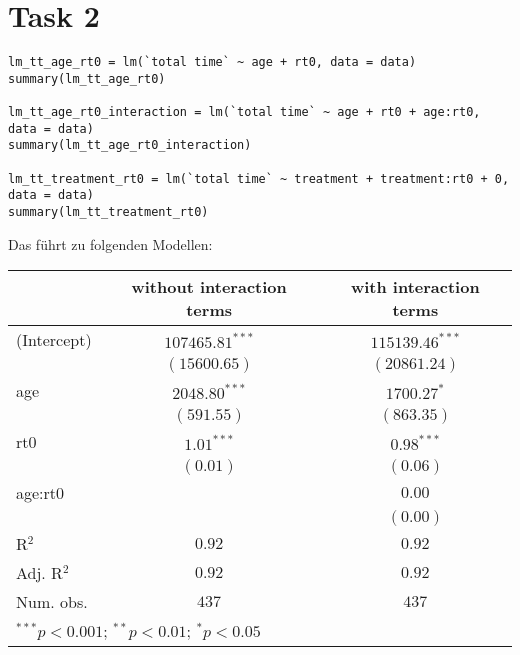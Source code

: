 \documentclass{article}
\begin{document}
	\section*{Task 2}
	\begin{lstlisting}
lm_tt_age_rt0 = lm(`total time` ~ age + rt0, data = data)
summary(lm_tt_age_rt0)

lm_tt_age_rt0_interaction = lm(`total time` ~ age + rt0 + age:rt0, data = data)
summary(lm_tt_age_rt0_interaction)

lm_tt_treatment_rt0 = lm(`total time` ~ treatment + treatment:rt0 + 0, data = data)
summary(lm_tt_treatment_rt0)
	\end{lstlisting}
	Das führt zu folgenden Modellen:
\begin{center}
\begin{tabular}{l c c}
\hline
 & without interaction terms &  with interaction terms \\
\hline
(Intercept) & $107465.81^{***}$ & $115139.46^{***}$ \\
            & $(15600.65)$      & $(20861.24)$      \\
age         & $2048.80^{***}$   & $1700.27^{*}$     \\
            & $(591.55)$        & $(863.35)$        \\
rt0         & $1.01^{***}$      & $0.98^{***}$      \\
            & $(0.01)$          & $(0.06)$          \\
age:rt0     &                   & $0.00$            \\
            &                   & $(0.00)$          \\
\hline
R$^2$       & $0.92$            & $0.92$            \\
Adj. R$^2$  & $0.92$            & $0.92$            \\
Num. obs.   & $437$             & $437$             \\
\hline
\multicolumn{3}{l}{\scriptsize{$^{***}p<0.001$; $^{**}p<0.01$; $^{*}p<0.05$}}
\end{tabular}
\end{center}
\end{document}
